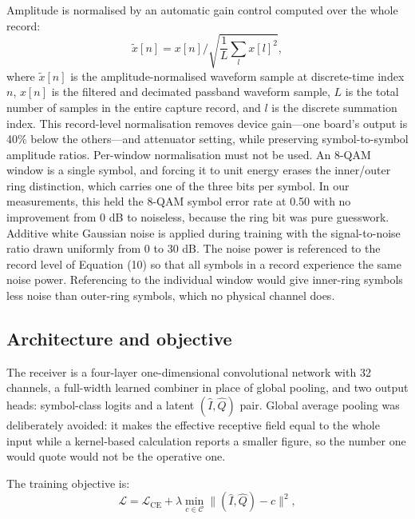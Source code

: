 \documentclass[journal]{IEEEtran}   %
\begin{document}
Amplitude is normalised by an automatic gain control computed over the whole record:
\begin{equation}
\tilde{x}[n] = x[n] \big/ \sqrt{\textstyle\frac{1}{L}\sum_{l} x[l]^2 } ,
\label{eq:agc}
\end{equation}
where $\tilde{x}[n]$ is the amplitude-normalised waveform sample at discrete-time index $n$, $x[n]$ is the filtered and decimated passband waveform sample, $L$ is the total number of samples in the entire capture record, and $l$ is the discrete summation index.   This record-level normalisation removes device gain—one board's output is 40\% below the others—and attenuator setting, while preserving symbol-to-symbol amplitude ratios. Per-window normalisation must not be used. An 8-QAM window is a single symbol, and forcing it to unit energy erases the inner/outer ring distinction, which carries one of the three bits per symbol. In our measurements, this held the 8-QAM symbol error rate at 0.50 with no improvement from 0 dB to noiseless, because the ring bit was pure guesswork.   Additive white Gaussian noise is applied during training with the signal-to-noise ratio drawn uniformly from 0 to 30 dB. The noise power is referenced to the record level of Equation (10) so that all symbols in a record experience the same noise power. Referencing to the individual window would give inner-ring symbols less noise than outer-ring symbols, which no physical channel does. 

\subsection{Architecture and objective}
The receiver is a four-layer one-dimensional convolutional network with 32
channels, a full-width learned combiner in place of global pooling, and two
output heads: symbol-class logits and a latent $(\hat{I},\hat{Q})$ pair. Global
average pooling was deliberately avoided: it makes the effective receptive field
equal to the whole input while a kernel-based calculation reports a smaller
figure, so the number one would quote would not be the operative one.

The training objective is:
\begin{equation}
\mathcal{L} = \mathcal{L}_{\mathrm{CE}}
  + \lambda \min_{c \in \mathcal{C}}
    \big\lVert (\hat{I},\hat{Q}) - c \big\rVert^2 ,
\label{eq:loss}
\end{equation}

\end{document}
